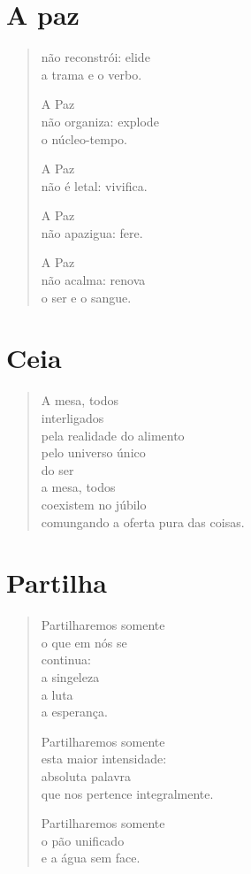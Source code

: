 \chapter{A paz}

\begin{verse}
não reconstrói: elide\\
a trama e o verbo.

A Paz\\
não organiza: explode\\
o núcleo-tempo.

A Paz\\
não é letal: vivifica.

A Paz\\
não apazigua: fere.

A Paz\\
não acalma: renova\\
o ser e o sangue.
\end{verse}

\chapter{Ceia}

\begin{verse}
A mesa, todos\\
interligados\\
pela realidade do alimento\\
pelo universo único\\
do ser\\
a mesa, todos\\
coexistem no júbilo\\
comungando a oferta pura das coisas.
\end{verse}

\chapter{Partilha}

\begin{verse}
Partilharemos somente\\
o que em nós se\\
continua:\\
a singeleza\\
a luta\\
a esperança.

Partilharemos somente\\
esta maior intensidade:\\
absoluta palavra\\
que nos pertence integralmente.

Partilharemos somente\\
o pão unificado\\
e a água sem face.
\end{verse}

